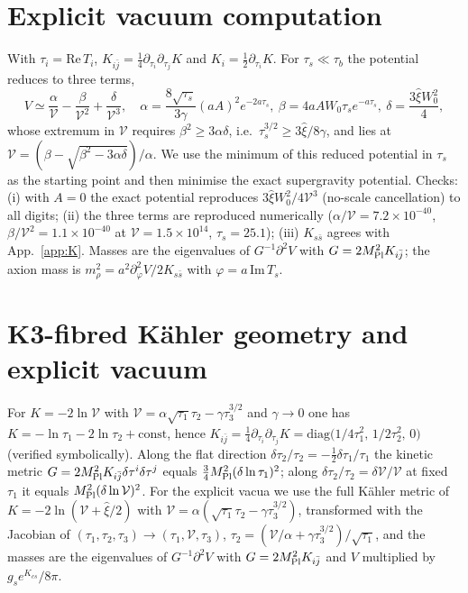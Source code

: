 \documentclass[11pt]{article}
\newcommand{\MP}{M_{\rm Pl}}
\begin{document}
\section{Explicit vacuum computation}\label{app:vac}
With $\tau_i=\mathrm{Re}\,T_i$, $K_{i\bar j}=\tfrac14\partial_{\tau_i}\partial_{\tau_j}K$ and $K_i=\tfrac12\partial_{\tau_i}K$. For $\tau_s\ll\tau_b$ the potential reduces to three terms,
\begin{equation}
V\simeq\frac{\alpha}{\mathcal V}-\frac{\beta}{\mathcal V^2}+\frac{\delta}{\mathcal V^3},\quad\alpha=\frac{8\sqrt{\tau_s}}{3\gamma}(aA)^2e^{-2a\tau_s},\ \beta=4aAW_0\tau_se^{-a\tau_s},\ \delta=\frac{3\hat\xi W_0^2}{4},
\end{equation}
whose extremum in $\mathcal V$ requires $\beta^2\ge3\alpha\delta$, i.e.\ $\tau_s^{3/2}\ge3\hat\xi/8\gamma$, and lies at $\mathcal V=(\beta-\sqrt{\beta^2-3\alpha\delta})/\alpha$. We use the minimum of this reduced potential in $\tau_s$ as the starting point and then minimise the exact supergravity potential. Checks: (i) with $A=0$ the exact potential reproduces $3\hat\xi W_0^2/4\mathcal V^3$ (no-scale cancellation) to all digits; (ii) the three terms are reproduced numerically ($\alpha/\mathcal V=7.2\times10^{-40}$, $\beta/\mathcal V^2=1.1\times10^{-40}$ at $\mathcal V=1.5\times10^{14}$, $\tau_s=25.1$); (iii) $K_{s\bar s}$ agrees with App.~\ref{app:K}. Masses are the eigenvalues of $G^{-1}\partial^2V$ with $G=2\MP^2K_{i\bar j}$; the axion mass is $m_\rho^2=a^2\partial^2_\varphi V/2K_{s\bar s}$ with $\varphi=a\,\mathrm{Im}\,T_s$.

\section{K3-fibred Kähler geometry and explicit vacuum}\label{app:k3}
For $K=-2\ln\mathcal V$ with $\mathcal V=\alpha\sqrt{\tau_1}\tau_2-\gamma\tau_3^{3/2}$ and $\gamma\to0$ one has $K=-\ln\tau_1-2\ln\tau_2+\text{const}$, hence $K_{i\bar j}=\tfrac14\partial_{\tau_i}\partial_{\tau_j}K=\mathrm{diag}\big(1/4\tau_1^2,\,1/2\tau_2^2,\,0\big)$ (verified symbolically). Along the flat direction $\delta\tau_2/\tau_2=-\tfrac12\delta\tau_1/\tau_1$ the kinetic metric $G=2\MP^2K_{i\bar j}\delta\tau^i\delta\tau^j$ equals $\tfrac34\MP^2(\delta\ln\tau_1)^2$; along $\delta\tau_2/\tau_2=\delta\mathcal V/\mathcal V$ at fixed $\tau_1$ it equals $\MP^2(\delta\ln\mathcal V)^2$. For the explicit vacua we use the full Kähler metric of $K=-2\ln(\mathcal V+\hat\xi/2)$ with $\mathcal V=\alpha(\sqrt{\tau_1}\tau_2-\gamma\tau_3^{3/2})$, transformed with the Jacobian of $(\tau_1,\tau_2,\tau_3)\to(\tau_1,\mathcal V,\tau_3)$, $\tau_2=(\mathcal V/\alpha+\gamma\tau_3^{3/2})/\sqrt{\tau_1}$, and the masses are the eigenvalues of $G^{-1}\partial^2V$ with $G=2\MP^2K_{i\bar j}$ and $V$ multiplied by $g_se^{K_{cs}}/8\pi$.
\end{document}
